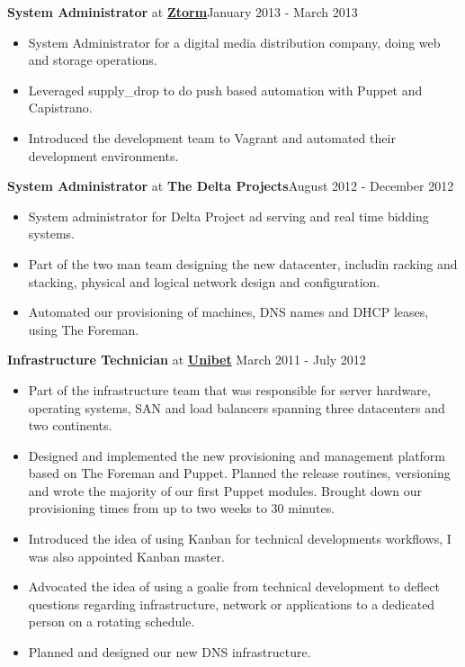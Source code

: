 \documentclass[8pt]{article}
\newenvironment{outerlist}[1][\enskip\textbullet]%
        {\begin{itemize}[#1]}{\end{itemize}%
         \vspace{-.6\baselineskip}}
\newcommand{\blankline}{\quad\pagebreak[2]}
\begin{document}
\textbf{System Administrator} at \href{http://www.ztorm.com}{\textbf{Ztorm}}\hfill {January 2013 - March 2013}
\begin{outerlist}
\item[] System Administrator for a digital media distribution company, doing web and storage operations. 

	\item Leveraged supply\_drop to do push based automation with Puppet and Capistrano.
	\item Introduced the development team to Vagrant and automated their development environments.
\end{outerlist}
\blankline

\textbf{System Administrator} at {\textbf{The Delta Projects}}\hfill {August 2012 - December 2012}
\begin{outerlist}
\item[] System administrator for Delta Project ad serving and real time bidding systems. 

	\item Part of the two man team designing the new datacenter, includin racking and stacking, physical and logical network design and
		configuration.
	\item Automated our provisioning of machines, DNS names and DHCP leases, using The Foreman. 
\end{outerlist}
\blankline

\textbf{Infrastructure Technician} at \href{http://www.unibet.com}{\textbf{Unibet}}  \hfill {March 2011 - July 2012}
\begin{outerlist}
\item[] Part of the infrastructure team that was responsible for server hardware, operating systems, SAN and load balancers spanning three datacenters and two continents.

	 \item Designed and implemented the new provisioning and management platform based on The Foreman and Puppet. Planned the release routines, versioning and wrote the majority of our first Puppet modules. Brought down our provisioning times from up to two weeks to 30 minutes.
	\item Introduced the idea of using Kanban for technical developments workflows, I was also appointed Kanban master.
	\item Advocated the idea of using a goalie from technical development to deflect questions regarding infrastructure, network or applications to a dedicated person on a rotating schedule.
	\item Planned and designed our new DNS infrastructure.
\end{outerlist}
\blankline
\end{document}
